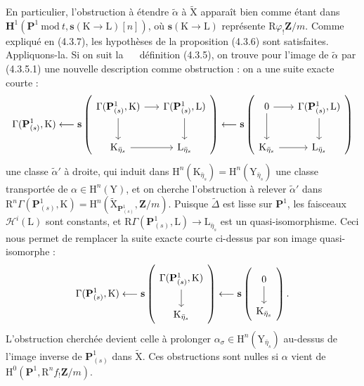 \documentclass[11pt,leqno]{article}
\newcommand{\Page}[1]{\ifvmode\noindent\else\unskip\ \fi{\footnotesize\textcolor{gray}{[p.\,#1]}}\ \ignorespaces}
\begin{document}
En particulier, l’obstruction à étendre \(\widetilde{\alpha}\) à \(\widetilde{\mathrm{X}}\) apparaît bien comme étant dans \(\mathbf{H}^1(\mathbf{P}^1\ \mathrm{mod}\ t,\mathbf{s}(\mathrm{K}\to\mathrm{L})[n])\), où \(\mathbf{s}(\mathrm{K}\to\mathrm{L})\) représente \(\mathrm{R}\varphi_!\mathbf{Z}/m\). Comme expliqué en (4.3.7), les hypothèses de la proposition (4.3.6) sont satisfaites. Appliquons-la. Si on suit la
\Page{226}
définition (4.3.5), on trouve pour l’image de \(\widetilde{\alpha}\) par (4.3.5.1) une nouvelle description comme obstruction : on a une suite exacte courte :
\[
\Gamma(\mathbf{P}^1_{(s)},\mathrm{K})
\longleftarrow
\mathbf{s}\left(
\begin{tikzcd}[ampersand replacement=\&, column sep=1.5em, row sep=2.2em]
\Gamma(\mathbf{P}^1_{(s)},\mathrm{K}) \arrow[r] \arrow[d]
  \& \Gamma(\mathbf{P}^1_{(s)},\mathrm{L}) \arrow[d] \\
\mathrm{K}_{\bar{\eta}_s} \arrow[r]
  \& \mathrm{L}_{\bar{\eta}_s}
\end{tikzcd}
\right)
\longleftarrow
\mathbf{s}\left(
\begin{tikzcd}[ampersand replacement=\&, column sep=1.5em, row sep=2.2em]
0 \arrow[r] \arrow[d]
  \& \Gamma(\mathbf{P}^1_{(s)},\mathrm{L}) \arrow[d] \\
\mathrm{K}_{\bar{\eta}_s} \arrow[r]
  \& \mathrm{L}_{\bar{\eta}_s}
\end{tikzcd}
\right)
\]
une classe \(\widetilde{\alpha}'\) à droite, qui induit dans \(\mathrm{H}^n(\mathrm{K}_{\bar{\eta}_s})=\mathrm{H}^n(\mathrm{Y}_{\bar{\eta}_s})\) une classe transportée de \(\alpha\in\mathrm{H}^n(\mathrm{Y})\), et on cherche l’obstruction à relever \(\widetilde{\alpha}'\) dans \(\mathrm{R}^n\Gamma(\mathbf{P}^1_{(s)},\mathrm{K})=\mathrm{H}^n(\widetilde{\mathrm{X}}_{\mathbf{P}^1_{(s)}},\mathbf{Z}/m)\). Puisque \(\widetilde{\Delta}\) est lisse sur \(\mathbf{P}^1\), les faisceaux \(\mathscr{H}^i(\mathrm{L})\) sont constants, et \(\mathrm{R}\Gamma(\mathbf{P}^1_{(s)},\mathrm{L})\to\mathrm{L}_{\bar{\eta}_s}\) est un quasi-isomorphisme. Ceci nous permet de remplacer la suite exacte courte ci-dessus par son image quasi-isomorphe :
\[
\Gamma(\mathbf{P}^1_{(s)},\mathrm{K})
\longleftarrow
\mathbf{s}\left(
\begin{tikzcd}[ampersand replacement=\&, row sep=1.8em]
\Gamma(\mathbf{P}^1_{(s)},\mathrm{K}) \arrow[d] \\
\mathrm{K}_{\bar{\eta}_s}
\end{tikzcd}
\right)
\longleftarrow
\mathbf{s}\left(
\begin{tikzcd}[ampersand replacement=\&, row sep=1.8em]
0 \arrow[d] \\
\mathrm{K}_{\bar{\eta}_s}
\end{tikzcd}
\right).
\]
L’obstruction cherchée devient celle à prolonger \(\alpha_\sigma\in\mathrm{H}^n(\mathrm{Y}_{\bar{\eta}_s})\) au-dessus de l’image inverse de \(\mathbf{P}^1_{(s)}\) dans \(\widetilde{\mathrm{X}}\). Ces obstructions sont nulles si \(\alpha\) vient de \(\mathrm{H}^0(\mathbf{P}^1,\mathrm{R}^nf_!\mathbf{Z}/m)\).
\end{document}

